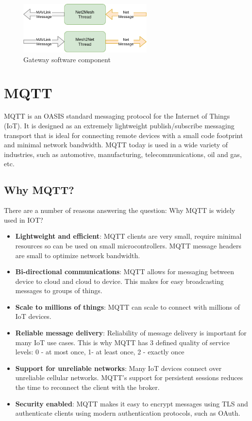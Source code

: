 \documentclass[\main/main.tex]{subfiles}
\begin{document}
\begin{figure}[H]
    \begin{center}
        \includegraphics[width=0.6\textwidth]{gateway_software.png}
    \end{center}
    \caption{Gateway software component}
    \label{fig:gateway_software}
\end{figure}

\section{MQTT}
MQTT is an OASIS standard messaging protocol for the Internet of Things (IoT). It is designed as an extremely lightweight publish/subscribe messaging transport that is ideal for connecting remote devices with a small code footprint and minimal network bandwidth. MQTT today is used in a wide variety of industries, such as automotive, manufacturing, telecommunications, oil and gas, etc. \cite{web_mqtt_org}

\subsection*{Why MQTT?}

There are a number of reasons answering the question: Why MQTT is widely used in IOT? 
\begin{itemize}
    \item \textbf{Lightweight and efficient}: MQTT clients are very small, require minimal resources so can be used on small microcontrollers. MQTT message headers are small to optimize network bandwidth.
    \item \textbf{Bi-directional communications}: MQTT allows for messaging between device to cloud and cloud to device. This makes for easy broadcasting messages to groups of things.
    \item \textbf{Scale to millions of things}: MQTT can scale to connect with millions of IoT devices.
    \item \textbf{Reliable message delivery}: Reliability of message delivery is important for many IoT use cases. This is why MQTT has 3 defined quality of service levels: 0 - at most once, 1- at least once, 2 - exactly once
    \item \textbf{Support for unreliable networks}: Many IoT devices connect over unreliable cellular networks. MQTT’s support for persistent sessions reduces the time to reconnect the client with the broker.
    \item \textbf{Security enabled}: MQTT makes it easy to encrypt messages using TLS and authenticate clients using modern authentication protocols, such as OAuth.
\end{itemize}
\end{document}
